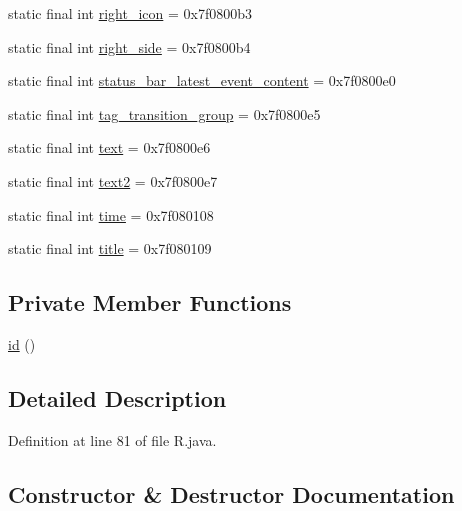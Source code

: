 \begin{DoxyCompactItemize}
static final int \mbox{\hyperlink{classandroid_1_1support_1_1mediacompat_1_1_r_1_1id_aef3074f375f1b5f9ff46fd31dc8b9dd8}{right\+\_\+icon}} = 0x7f0800b3
\item 
static final int \mbox{\hyperlink{classandroid_1_1support_1_1mediacompat_1_1_r_1_1id_a4dda28736626841361621768676f8cc5}{right\+\_\+side}} = 0x7f0800b4
\item 
static final int \mbox{\hyperlink{classandroid_1_1support_1_1mediacompat_1_1_r_1_1id_a1d6982da9abf7a38d286554e24eb056a}{status\+\_\+bar\+\_\+latest\+\_\+event\+\_\+content}} = 0x7f0800e0
\item 
static final int \mbox{\hyperlink{classandroid_1_1support_1_1mediacompat_1_1_r_1_1id_a9bdc2a1b5e3044ae4478cdaf8ecdf1c5}{tag\+\_\+transition\+\_\+group}} = 0x7f0800e5
\item 
static final int \mbox{\hyperlink{classandroid_1_1support_1_1mediacompat_1_1_r_1_1id_a27977888343c802d53fd8e31094c4d46}{text}} = 0x7f0800e6
\item 
static final int \mbox{\hyperlink{classandroid_1_1support_1_1mediacompat_1_1_r_1_1id_af89db6d57c69dfd896242a53693866c9}{text2}} = 0x7f0800e7
\item 
static final int \mbox{\hyperlink{classandroid_1_1support_1_1mediacompat_1_1_r_1_1id_af3ae580d9965637cb4e92633f0d964ee}{time}} = 0x7f080108
\item 
static final int \mbox{\hyperlink{classandroid_1_1support_1_1mediacompat_1_1_r_1_1id_a6040b8dfeb6da7cd9778754e38ed9bb3}{title}} = 0x7f080109
\end{DoxyCompactItemize}
\subsection*{Private Member Functions}
\begin{DoxyCompactItemize}
\item 
\mbox{\hyperlink{classandroid_1_1support_1_1mediacompat_1_1_r_1_1id_a16ebb1a63a294ec36cdb009f5488fae0}{id}} ()
\end{DoxyCompactItemize}


\subsection{Detailed Description}


Definition at line 81 of file R.\+java.



\subsection{Constructor \& Destructor Documentation}
\mbox{\label{classandroid_1_1support_1_1mediacompat_1_1_r_1_1id_a16ebb1a63a294ec36cdb009f5488fae0}} 
